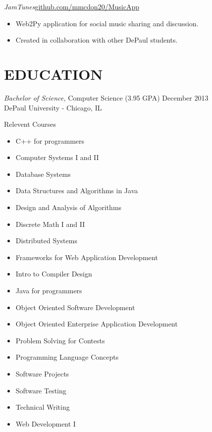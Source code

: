 \documentclass[margin]{res}
\begin{document}
\begin{resume}
                {\sl JamTunes}\hfill \href{http://github.com/mmcdon20/MusicApp}{github.com/mmcdon20/MusicApp}
                \begin{itemize} \itemsep -2pt
                  \item Web2Py application for social music sharing and discussion.
                  \item Created in collaboration with other DePaul students.
                \end{itemize}        
                
\section{EDUCATION} 
                {\sl Bachelor of Science,} Computer Science (3.95 GPA) \hfill December 2013 \\
                DePaul University - Chicago, IL 
                \begin{multicols}{2} \centerline{Relevent Courses}
                  \begin{itemize} \itemsep -2pt 
                    \item C++ for programmers
                    \item Computer Systems I and II
                    \item Database Systems
                    \item Data Structures and Algorithms in Java
                    \item Design and Analysis of Algorithms
                    \item Discrete Math I and II
                    \item Distributed Systems
                    \item Frameworks for Web Application Development                  
                    \item Intro to Compiler Design
                    \item Java for programmers
                    \item Object Oriented Software Development
                    \item Object Oriented Enterprise Application Development
                    \item Problem Solving for Contests
                    \item Programming Language Concepts
                    \item Software Projects
                    \item Software Testing
                    \item Technical Writing
                    \item Web Development I
                  \end{itemize}
                \end{multicols}


\end{resume}
\end{document}
